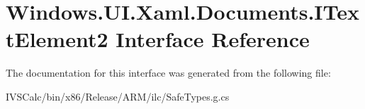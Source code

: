 \hypertarget{interface_windows_1_1_u_i_1_1_xaml_1_1_documents_1_1_i_text_element2}{}\section{Windows.\+U\+I.\+Xaml.\+Documents.\+I\+Text\+Element2 Interface Reference}
\label{interface_windows_1_1_u_i_1_1_xaml_1_1_documents_1_1_i_text_element2}


The documentation for this interface was generated from the following file\+:\begin{DoxyCompactItemize}
\item 
I\+V\+S\+Calc/bin/x86/\+Release/\+A\+R\+M/ilc/Safe\+Types.\+g.\+cs\end{DoxyCompactItemize}
